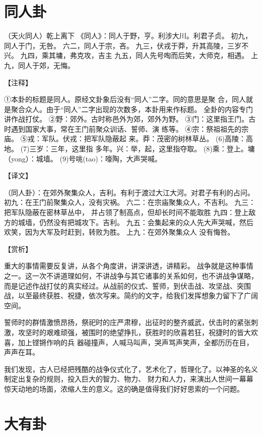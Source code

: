 \documentclass[a4paper,12pt,UTF8,twoside]{ctexbook}
\begin{document}
\chapter{同人卦}

（天火同人）乾上离下
《同人》：同人于野，亨。利涉大川。利君子贞。
初九，同人于门，无咎。
六二，同人于宗，吝。
九三，伏戎于莽，升其高陵，三岁不兴。
九四，乘其墉，弗克攻，吉主
九五，同人先号啕而后笑，大师克，相遇。
上九，同人于郊，无悔。

【注释】

①本卦的标题是同人。原经文卦象后没有“同人”二字。同的意思是聚 合，同人就是聚合众人。由于“同人”二字出现的次数多，本卦用来作标题。 全卦的内容专门讲作战打仗。
②野：郊外。古时称邑外为郊，郊外为野。
③门：这里指王门。古时遇到国家大事，常在王门前聚众训话、誓师、演 练等。
④宗：祭祖祖先的宗庙。
⑤戎：军队。伏戎：把军队隐蔽起 来。莽：茂密的树林草丛。
(6)高陵：高地。
(7)三岁：三年，这里指 多年。兴：举，起，这里指夺取。
(8)乘：登上。墉（yong）：城墙。
(9)号咷(tao)：嚎陶，大声哭喊。

【译文】

（同人卦）：在郊外聚集众人，吉利。有利于渡过大江大河。对君子有利的占问。
初九：在王门前聚集众人，没有灾祸。
六二：在宗庙聚集众人，不吉利。
九三：把军队隐蔽在密林草丛中， 并占领了制高点，但却长时间不能取胜
九四：登上敌方的城墙，仍然没有把城攻下。吉利。
九五：会集起来的众人先大声哭喊，然后欢笑，因为大军及时赶到，转败为胜。
上九：在郊外聚集众人 没有悔咎。

【赏析】

重大的事情需要反复讲，从各个角度讲，讲深讲透，讲精彩。 战争就是这种事情之一。这一次不讲道理如何，不讲战争与其它诸事的关系如何，也不讲战争谋略，而是记述作战打仗的真实经过。从战前的仪式、誓师，到伏击战、攻坚战、突围战，以至最终获胜、祝捷，依次写来。简约的文字，给我们发挥想象力留下了广阔空间。

誓师时的群情激愤昂扬，祭祀时的庄严肃穆，出征时的整齐威武，伏击时的紧张刺激，攻坚时的艰难顽强，被围时的绝望挣扎，获胜时的欣喜若狂，祝捷时的皆大欢喜，加上铿锵作响的兵 器碰撞声，人喊马叫声，哭声骂声笑声，全都历历在目，声声在耳。

我们发现，古人已经把残酷的战争仪式化了，艺术化了，哲理化了。以神圣的名义制定出复杂的规则，投入巨大的智力、物力、 财力和人力，来演出人世间一幕幕惊天动地的场面，浓缩人生的意义。这的确是值得我们好好思索的一个问题。

\chapter{大有卦}
\end{document}

